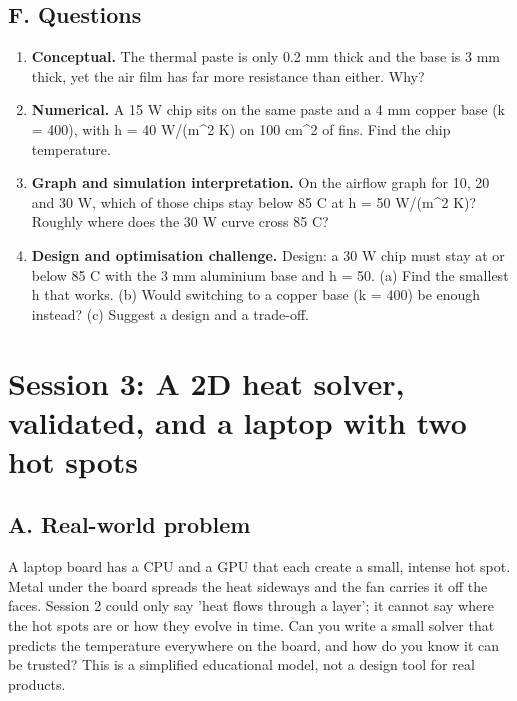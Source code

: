 \documentclass[11pt,a4paper]{article}
\begin{document}
\subsection*{F. Questions}
\begin{enumerate}[nosep]
\item \textbf{Conceptual.} The thermal paste is only 0.2 mm thick and the base is 3 mm thick, yet the air film has far more resistance than either. Why?
\item \textbf{Numerical.} A 15 W chip sits on the same paste and a 4 mm copper base (k = 400), with h = 40 W/(m\textasciicircum{}2 K) on 100 cm\textasciicircum{}2 of fins. Find the chip temperature.
\item \textbf{Graph and simulation interpretation.} On the airflow graph for 10, 20 and 30 W, which of those chips stay below 85 C at h = 50 W/(m\textasciicircum{}2 K)? Roughly where does the 30 W curve cross 85 C?
\item \textbf{Design and optimisation challenge.} Design: a 30 W chip must stay at or below 85 C with the 3 mm aluminium base and h = 50. (a) Find the smallest h that works. (b) Would switching to a copper base (k = 400) be enough instead? (c) Suggest a design and a trade-off.
\end{enumerate}

\section{Session 3: A 2D heat solver, validated, and a laptop with two hot spots}

\subsection*{A. Real-world problem}
A laptop board has a CPU and a GPU that each create a small, intense hot spot. Metal under the board spreads the heat sideways and the fan carries it off the faces. Session 2 could only say 'heat flows through a layer'; it cannot say where the hot spots are or how they evolve in time. Can you write a small solver that predicts the temperature everywhere on the board, and how do you know it can be trusted? This is a simplified educational model, not a design tool for real products.
\end{document}
